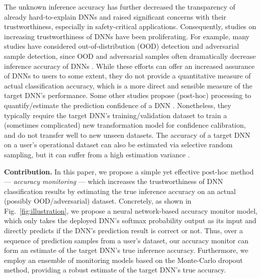 \documentclass{article}
\begin{document}
The unknown inference accuracy has further decreased
the transparency of already hard-to-explain DNNs
and raised significant concerns with their trustworthiness, especially in safety-critical applications.
Consequently,
studies on increasing trustworthiness of DNNs
have been proliferating.
For example, many studies have
considered out-of-distribution (OOD) detection and
adversarial sample detection, since OOD and adversarial
samples often dramatically decrease inference accuracy of DNNs
\cite{DNN_Uncertainty_Baseline_OOD_ICLR_2017,Verification_DeepVerifier_OOD_Adversarial_Bengio_2019_arXiv,Verification_SimpleFramework_OOD_Generative_Gaussian_NIPS_2018_7947,Verification_OOD_Detection_ODIN_Srikant_UIUC_ICLR_2018}.
While these efforts can offer an increased assurance of DNNs
 to users to some extent,
they do not provide
a quantitative measure of actual classification accuracy, which
is a more direct and sensible measure
of the target DNN's performance.
 Some other studies propose (post-hoc) processing
to quantify/estimate
the prediction confidence of a DNN
\cite{DNN_Calibration_TemperatureScaling_ICML_2017_calibration_guo_2017,DNN_Uncertainty_PostHoc_Dirichlet_NIPS_2019_kull2019beyond,DNN_Uncertainty_Estimation_Summary_NIPS_2019_ovadia}.
Nonetheless, they typically require 
the target
DNN's  training/validation dataset
to train a (sometimes complicated)
new transformation model for confidence calibration,
and do not transfer well to new unseen datasets.
The accuracy of a target DNN on a user's operational dataset
can also be estimated via selective random sampling,
but it can suffer from a high estimation variance \cite{DNN_Operational_Testing_NJU_FSE_2019_10.1145/3338906.3338930}.

\textbf{Contribution.} In this paper, we propose a simple yet effective post-hoc method ---
\emph{accuracy monitoring} --- which increases
the trustworthiness of DNN classification results
by estimating
the true inference accuracy on an actual (possibly OOD/adversarial) dataset.
Concretely, as shown in Fig.~\ref{fig:illustration}, we propose a neural network-based accuracy monitor model,
which only takes the deployed
DNN's softmax probability output as its input
and directly predicts if the DNN's prediction result is correct or not.
Thus, over a sequence of prediction samples from
a user's dataset, our accuracy monitor
can form an estimate of the target DNN's true inference accuracy.
Furthermore, we employ an
ensemble of monitoring models based on the Monte-Carlo  dropout method,
providing a robust
estimate of the target DNN's true accuracy.
\end{document}
